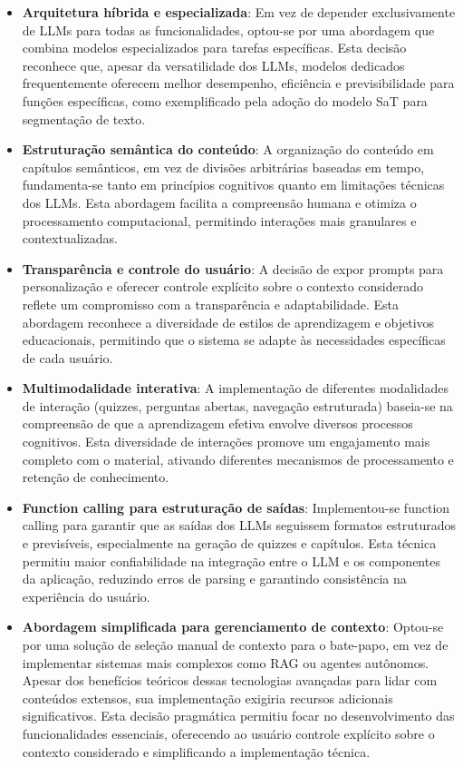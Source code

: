 \documentclass[tcc,capa]{texufpel}
\begin{document}
\begin{itemize}
    \item \textbf{Arquitetura híbrida e especializada}: Em vez de depender exclusivamente de LLMs para todas as funcionalidades, optou-se por uma abordagem que combina modelos especializados para tarefas específicas. Esta decisão reconhece que, apesar da versatilidade dos LLMs, modelos dedicados frequentemente oferecem melhor desempenho, eficiência e previsibilidade para funções específicas, como exemplificado pela adoção do modelo SaT para segmentação de texto.
    
    \item \textbf{Estruturação semântica do conteúdo}: A organização do conteúdo em capítulos semânticos, em vez de divisões arbitrárias baseadas em tempo, fundamenta-se tanto em princípios cognitivos quanto em limitações técnicas dos LLMs. Esta abordagem facilita a compreensão humana e otimiza o processamento computacional, permitindo interações mais granulares e contextualizadas.
    
    \item \textbf{Transparência e controle do usuário}: A decisão de expor prompts para personalização e oferecer controle explícito sobre o contexto considerado reflete um compromisso com a transparência e adaptabilidade. Esta abordagem reconhece a diversidade de estilos de aprendizagem e objetivos educacionais, permitindo que o sistema se adapte às necessidades específicas de cada usuário.
    
    \item \textbf{Multimodalidade interativa}: A implementação de diferentes modalidades de interação (quizzes, perguntas abertas, navegação estruturada) baseia-se na compreensão de que a aprendizagem efetiva envolve diversos processos cognitivos. Esta diversidade de interações promove um engajamento mais completo com o material, ativando diferentes mecanismos de processamento e retenção de conhecimento.
    
    \item \textbf{Function calling para estruturação de saídas}: Implementou-se function calling para garantir que as saídas dos LLMs seguissem formatos estruturados e previsíveis, especialmente na geração de quizzes e capítulos. Esta técnica permitiu maior confiabilidade na integração entre o LLM e os componentes da aplicação, reduzindo erros de parsing e garantindo consistência na experiência do usuário.
    
    \item \textbf{Abordagem simplificada para gerenciamento de contexto}: Optou-se por uma solução de seleção manual de contexto para o bate-papo, em vez de implementar sistemas mais complexos como RAG ou agentes autônomos. Apesar dos benefícios teóricos dessas tecnologias avançadas para lidar com conteúdos extensos, sua implementação exigiria recursos adicionais significativos. Esta decisão pragmática permitiu focar no desenvolvimento das funcionalidades essenciais, oferecendo ao usuário controle explícito sobre o contexto considerado e simplificando a implementação técnica.
\end{itemize}
\end{document}
